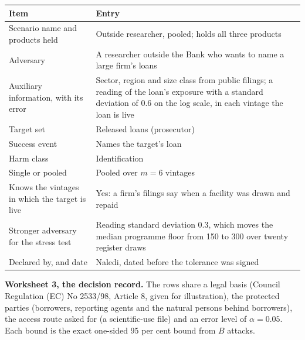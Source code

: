 \begin{example}
\begin{center}\footnotesize
\begin{tabular}{@{}>{\raggedright\arraybackslash}p{4.2cm}>{\raggedright\arraybackslash}p{9.2cm}@{}}
\toprule
Item & Entry \\
\midrule
Scenario name and products held & Outside researcher, pooled; holds all three products \\
Adversary & A researcher outside the Bank who wants to name a large firm's loans \\
Auxiliary information, with its error & Sector, region and size class from public filings; a reading of the loan's exposure with a standard deviation of 0.6 on the log scale, in each vintage the loan is live \\
Target set & Released loans (prosecutor) \\
Success event & Names the target's loan \\
Harm class & Identification \\
Single or pooled & Pooled over $m = 6$ vintages \\
Knows the vintages in which the target is live & Yes: a firm's filings say when a facility was drawn and repaid \\
Stronger adversary for the stress test & Reading standard deviation 0.3, which moves the median programme floor from 150 to 300 over twenty register draws \\
Declared by, and date & Naledi, dated before the tolerance was signed \\
\bottomrule
\end{tabular}
\end{center}

\noindent\textbf{Worksheet 3, the decision record.} The rows share a legal basis (Council
Regulation (EC) No 2533/98, Article 8, given for illustration), the protected parties
(borrowers, reporting agents and the natural persons behind borrowers), the access route
asked for (a scientific-use file) and an error level of $\alpha = 0.05$. Each bound is the
exact one-sided 95 per cent bound from $B$ attacks.


\end{example}
